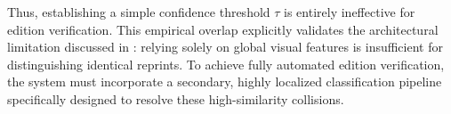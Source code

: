 Thus, establishing a simple confidence threshold $\tau$ is entirely ineffective for edition verification. This empirical overlap explicitly validates the architectural limitation discussed in : relying solely on global visual features is insufficient for distinguishing identical reprints. To achieve fully automated edition verification, the system must incorporate a secondary, highly localized classification pipeline specifically designed to resolve these high-similarity collisions.

